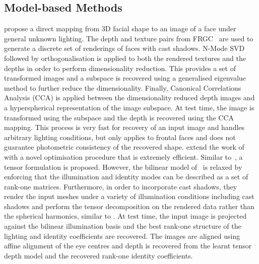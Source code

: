 \subsection{Model-based Methods}\label{subsec:bg_model_based_model}
\citet{minsik2013robust} propose a direct mapping from 3D facial shape to an
image of a face under general unknown lighting. The depth and texture pairs from
FRGC~\cite{phillips2005overview} are used to generate a discrete set of
renderings of faces with cast shadows. N-Mode
SVD~\cite{vasilescu2003multilinear} followed by orthogonalisation is applied to
both the rendered textures and the depths in order to perform dimensionality
reduction. This provides a set of transformed images and a subspace is recovered
using a generalised eigenvalue method to further reduce the dimensionality.
Finally, Canonical Correlations Analysis (CCA) is applied between the
dimensionality reduced depth images and a hyperspherical representation of the
image subspace. At test time, the image is transformed using the subspace and
the depth is recovered using the CCA mapping. This process is very fast for
recovery of an input image and handles arbitrary lighting conditions, but
only applies to frontal faces and does not guarantee photometric consistency
of the recovered shape.
\citet{minsik2014realtime} extend the work of \citet{minsik2011fast} with a
novel optimisation procedure that is extremely efficient. Similar
to~\cite{minsik2011fast}, a tensor formulation is proposed. However, the
bilinear model of~\cite{minsik2011fast} is relaxed by enforcing that the
illumination and identity modes can be described as a set of rank-one matrices.
Furthermore, in order to incorporate cast shadows, they render the input meshes
under a variety of illumination conditions including cast shadows and perform
the tensor decomposition on the rendered data rather than the spherical
harmonics, similar to \citet{minsik2013robust}. At test time, the input image
is projected against the bilinear illumination basis and the best rank-one
structure of the lighting and identity coefficients are recovered. The images
are aligned using affine alignment of the eye centres and depth is recovered
from the learnt tensor depth model and the recovered rank-one identity
coefficients.
